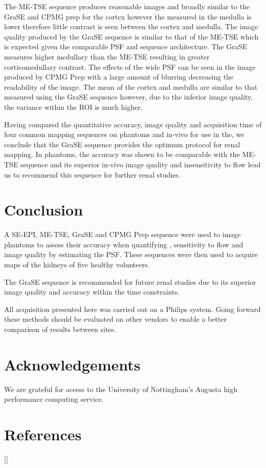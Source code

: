The \ac{ME-TSE} sequence produces reasonable images and broadly similar \ttwo to the \ac{GraSE} and \ac{CPMG} \ttwo prep for the cortex however the \ttwo measured in the medulla is lower therefore little contrast is seen between the cortex and medulla.  The image quality produced by the \ac{GraSE} sequence is similar to that of the \ac{ME-TSE} which is expected given the comparable \ac{PSF} and sequence architecture. The \ac{GraSE} measures higher medullary \ttwo than the \ac{ME-TSE} resulting in greater corticomedullary contrast. The effects of the wide \ac{PSF} can be seen in the image produced by \ac{CPMG} \ttwo Prep with a large amount of blurring decreasing the readability of the image. The mean \ttwo of the cortex and medulla are similar to that measured using the \ac{GraSE} sequence however, due to the inferior image quality, the variance within the \ac{ROI} is much higher.

Having compared the quantitative accuracy, image quality and acquisition time of four common \ttwo mapping sequences on phantoms and in-vivo for use in the, we conclude that the \ac{GraSE} sequence provides the optimum protocol for renal \ttwo mapping. In phantoms, the accuracy was shown to be comparable with the \ac{ME-TSE} sequence and its superior in-vivo image quality and insensitivity to flow lead us to recommend this sequence for further renal studies.

\section{Conclusion}

A \ac{SE}-\ac{EPI}, \ac{ME-TSE}, \ac{GraSE} and \ac{CPMG} \ttwo Prep sequence were used to image phantoms to assess their accuracy when quantifying \ttwo, sensitivity to flow and image quality by estimating the \ac{PSF}. These sequences were then used to acquire \ttwo maps of the kidneys of five healthy volunteers.

The \ac{GraSE} sequence is recommended for future renal studies due to its superior image quality and accuracy within the time constraints.

All acquisition presented here was carried out on a Philips system. Going forward these methods should be evaluated on other vendors to enable a better comparison of results between sites.

\section{Acknowledgements}

We are grateful for access to the University of Nottingham's Augusta high performance computing service.

\newpage
\section{References}
[\refname]{}
\printbibliography